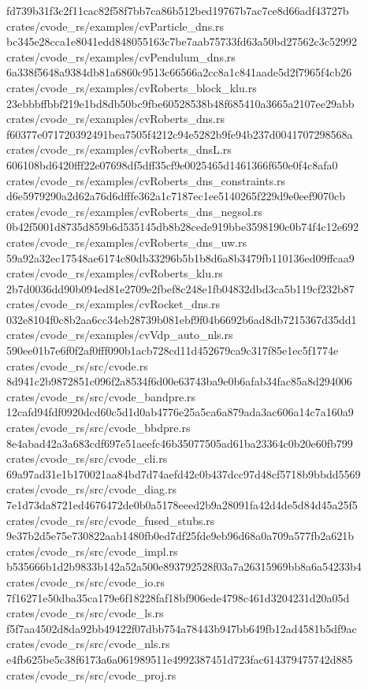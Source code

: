 \documentclass[
  10pt,
]{article}
\newenvironment{Shaded}{}{}
\newcommand{\NormalTok}[1]{#1}
\begin{document}
\begin{Shaded}
\begin{Highlighting}[]
\NormalTok{fd739b31f3c2f11cac82f58f7bb7ca86b512bed19767b7ac7ce8d66adf43727b  crates/cvode\_rs/examples/cvParticle\_dns.rs}
\NormalTok{bc345e28cca1e8041edd848055163c7be7aab75733fd63a50bd27562c3c52992  crates/cvode\_rs/examples/cvPendulum\_dns.rs}
\NormalTok{6a338f5648a9384db81a6860c9513c66566a2cc8a1c841aade5d2f7965f4cb26  crates/cvode\_rs/examples/cvRoberts\_block\_klu.rs}
\NormalTok{23ebbbffbbf219e1bd8db50bc9fbe60528538b48f685410a3665a2107ee29abb  crates/cvode\_rs/examples/cvRoberts\_dns.rs}
\NormalTok{f60377e071720392491bea7505f4212c94e5282b9fe94b237d0041707298568a  crates/cvode\_rs/examples/cvRoberts\_dnsL.rs}
\NormalTok{606108bd6420fff22e07698df5dff35cf9e0025465d1461366f650e0f4c8afa0  crates/cvode\_rs/examples/cvRoberts\_dns\_constraints.rs}
\NormalTok{d6e5979290a2d62a76d6dfffe362a1c7187ec1ee5140265f229d9e0eef9070cb  crates/cvode\_rs/examples/cvRoberts\_dns\_negsol.rs}
\NormalTok{0b42f5001d8735d859b6d535145db8b28cede919bbe3598190c0b74f4c12e692  crates/cvode\_rs/examples/cvRoberts\_dns\_uw.rs}
\NormalTok{59a92a32ec17548ae6174c80db33296b5b1b8d6a8b3479fb110136ed09ffcaa9  crates/cvode\_rs/examples/cvRoberts\_klu.rs}
\NormalTok{2b7d0036dd90b094ed81e2709e2fbef8c248e1fb04832dbd3ca5b119cf232b87  crates/cvode\_rs/examples/cvRocket\_dns.rs}
\NormalTok{032e8104f0c8b2aa6cc34eb28739b081ebf9f04b6692b6ad8db7215367d35dd1  crates/cvode\_rs/examples/cvVdp\_auto\_nls.rs}
\NormalTok{590ee01b7e6f0f2af0fff090b1acb728cd11d452679ca9c317f85e1ec5f1774e  crates/cvode\_rs/src/cvode.rs}
\NormalTok{8d941c2b9872851c096f2a8534f6d00e63743ba9e0b6afab34fac85a8d294006  crates/cvode\_rs/src/cvode\_bandpre.rs}
\NormalTok{12cafd94fdf0920dcd60c5d1d0ab4776e25a5ca6a879ada3ac606a14c7a160a9  crates/cvode\_rs/src/cvode\_bbdpre.rs}
\NormalTok{8e4abad42a3a683cdf697e51aeefc46b35077505ad61ba23364c0b20e60fb799  crates/cvode\_rs/src/cvode\_cli.rs}
\NormalTok{69a97ad31e1b170021aa84bd7d74aefd42c0b437dcc97d48cf5718b9bbdd5569  crates/cvode\_rs/src/cvode\_diag.rs}
\NormalTok{7e1d73da8721ed4676472de0b0a5178eeed2b9a28091fa42d4de5d84d45a25f5  crates/cvode\_rs/src/cvode\_fused\_stubs.rs}
\NormalTok{9e37b2d5e75e730822aab1480fb0ed7df25fde9eb96d68a0a709a577fb2a621b  crates/cvode\_rs/src/cvode\_impl.rs}
\NormalTok{b535666b1d2b9833b142a52a500e893792528f03a7a26315969bb8a6a54233b4  crates/cvode\_rs/src/cvode\_io.rs}
\NormalTok{7f16271e50dba35ca179e6f18228faf18bf906ede4798c461d3204231d20a05d  crates/cvode\_rs/src/cvode\_ls.rs}
\NormalTok{f5f7aa4502d8da92bb49422f07dbb754a78443b947bb649fb12ad4581b5df9ac  crates/cvode\_rs/src/cvode\_nls.rs}
\NormalTok{e4fb625be5c38f6173a6a061989511e4992387451d723fac614379475742d885  crates/cvode\_rs/src/cvode\_proj.rs}

\end{Highlighting}
\end{Shaded}
\end{document}

